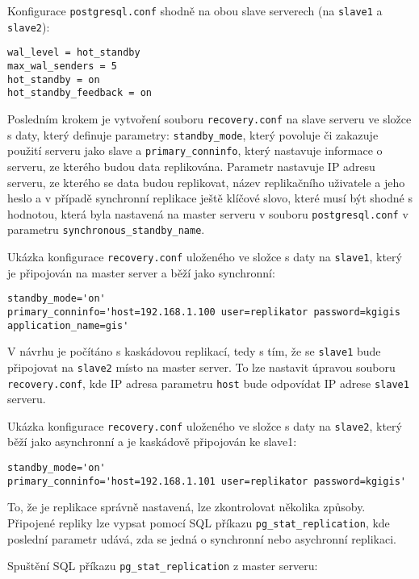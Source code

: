 Konfigurace \texttt{postgresql.conf} shodně na obou slave serverech (na \texttt{slave1} a \texttt{slave2}):
\begin{lstlisting}
wal_level = hot_standby
max_wal_senders = 5
hot_standby = on
hot_standby_feedback = on
\end{lstlisting}

Posledním krokem je vytvoření souboru \texttt{recovery.conf} na slave serveru ve
složce s daty, který definuje parametry:
\texttt{standby\_mode}, který povoluje či zakazuje použití serveru jako slave a
\texttt{primary\_conninfo}, který nastavuje informace o serveru, ze kterého
budou data replikována. Parametr nastavuje IP adresu serveru, ze kterého se data
budou replikovat, název replikačního uživatele a jeho heslo a v případě
synchronní replikace ještě klíčové slovo, které musí být shodné s hodnotou,
která byla nastavená na master serveru v souboru \texttt{postgresql.conf} v
parametru \texttt{synchronous\_standby\_name}.

Ukázka konfigurace \texttt{recovery.conf} uloženého ve složce s daty na \texttt{slave1}, který je připojován na master server a běží jako synchronní:

\begin{lstlisting}
standby_mode='on'
primary_conninfo='host=192.168.1.100 user=replikator password=kgigis application_name=gis'
\end{lstlisting}

V návrhu je počítáno s kaskádovou replikací, tedy s tím, že se \texttt{slave1} bude připojovat na \texttt{slave2} místo na master server. To lze nastavit úpravou souboru \texttt{recovery.conf}, kde IP adresa parametru \texttt{host} bude odpovídat IP adrese \texttt{slave1} serveru.

Ukázka konfigurace \texttt{recovery.conf} uloženého ve složce s daty na \texttt{slave2}, který běží jako asynchronní a je kaskádově připojován ke slave1:

\begin{lstlisting}
standby_mode='on'
primary_conninfo='host=192.168.1.101 user=replikator password=kgigis'
\end{lstlisting}

To, že je replikace správně nastavená, lze zkontrolovat několika způsoby. Připojené repliky lze vypsat pomocí SQL příkazu \texttt{pg\_stat\_replication}, kde poslední parametr udává, zda se jedná o synchronní nebo asychronní replikaci.

Spuštění SQL příkazu \texttt{pg\_stat\_replication} z master serveru:

